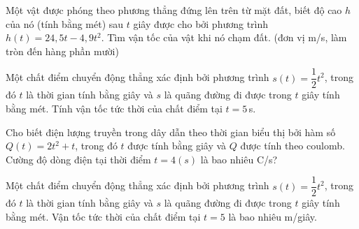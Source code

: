 \begin{ex}%
	Một vật được phóng theo phương thẳng đứng lên trên từ mặt đất, biết độ cao $h$ của nó (tính bằng  mét) sau $t$ giây được cho bởi phương trình $h(t)=24{,}5 t-4{,}9 t^2$. Tìm vận tốc của vật khi nó chạm đất. (đơn vị m/s, làm tròn đến hàng phần mười)
\end{ex}

\begin{ex}%
	Một chất điểm chuyển động thẳng xác định bởi phương trình $s(t)=\dfrac{1}{2} t^2$,  trong đó $t$ là thời gian tính bằng giây và $s$ là quãng đường đi được trong $t$ giây tính bằng mét. Tính vận tốc tức thời của chất điểm tại $t=5$\,s.
\end{ex}

\begin{ex}%
	Cho biết điện lượng truyền trong dây dẫn theo thời gian biểu thị bởi hàm số $Q(t)=2  t^2+t$, trong đó $t$ được tính bằng giây và $Q$ được tính theo coulomb. Cường độ dòng điện tại thời điểm $t=4(s)$ là bao nhiêu C/s?
\end{ex}

\begin{ex}%
	Một chất điểm  chuyển động thẳng xác định bởi phương trình $s(t)=\dfrac{1}{2} t^2$, trong đó $t$ là thời gian tính bằng giây và $s$ là quãng đường đi được trong $t$ giây tính bằng mét. Vận tốc tức thời của chất điểm tại $t=5$ là bao nhiêu m/giây.
\end{ex}

